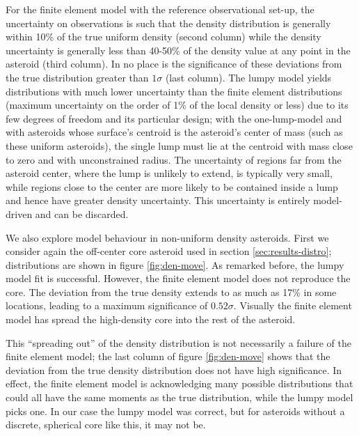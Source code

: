 \documentclass[fleqn,usenatbib]{mnras}
\begin{document}
For the finite element model with the reference observational set-up, the uncertainty on observations is such that the density distribution is generally within 10\% of the true uniform density (second column) while the density uncertainty is generally less than 40-50\% of the density value at any point in the asteroid (third column). In no place is the significance of these deviations from the true distribution greater than $1 \sigma$ (last column). The lumpy model yields distributions with much lower uncertainty than the finite element distributions (maximum uncertainty on the order of 1\% of the local density or less) due to its few degrees of freedom and its particular design; with the one-lump-model and with asteroids whose surface's centroid is the asteroid's center of mass (such as these uniform asteroids), the single lump must lie at the centroid with mass close to zero and with unconstrained radius. The uncertainty of regions far from the asteroid center, where the lump is unlikely to extend, is typically very small, while regions close to the center are more likely to be contained inside a lump and hence have greater density uncertainty. This uncertainty is entirely model-driven and can be discarded.

We also explore model behaviour in non-uniform density asteroids. First we consider again the off-center core asteroid used in section \ref{sec:results-distro}; distributions are shown in figure \ref{fig:den-move}. As remarked before, the lumpy model fit is successful. However, the finite element model does not reproduce the core. The deviation from the true density extends to as much as 17\% in some locations, leading to a maximum significance of $0.52\sigma$. Visually the finite element model has spread the high-density core into the rest of the asteroid.

This ``spreading out'' of the density distribution is not necessarily a failure of the finite element model; the last column of figure \ref{fig:den-move} shows that the deviation from the true density distribution does not have high significance. In effect, the finite element model is acknowledging many possible distributions that could all have the same moments as the true distribution, while the lumpy model picks one. In our case the lumpy model was correct, but for asteroids without a discrete, spherical core like this, it may not be.
\end{document}
